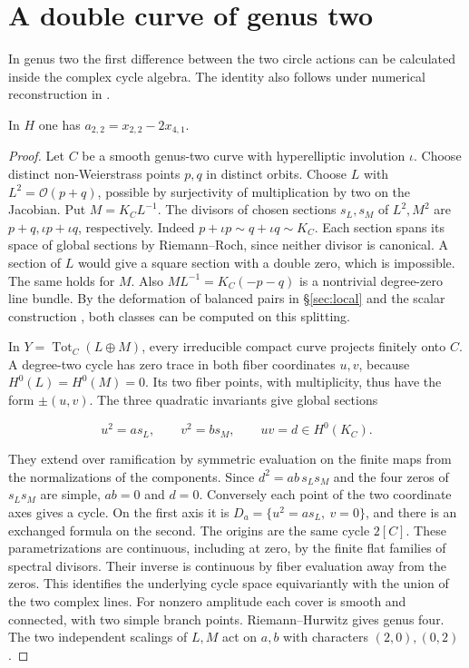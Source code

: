\section{A double curve of genus two}\label{sec:double}

In genus two the first difference between the two circle actions can
be calculated inside the complex cycle algebra. The identity also
follows under numerical reconstruction in \cite[\S6]{PaperIII}.

\begin{proposition}\label{prop:double}
In $H$ one has $a_{2,2}=x_{2,2}-2x_{4,1}$.
\end{proposition}
\begin{proof}
Let $C$ be a smooth genus-two curve with hyperelliptic involution
$\iota$. Choose distinct non-Weierstrass points $p,q$ in distinct
orbits. Choose $L$ with $L^2=\mathcal O(p+q)$, possible by
surjectivity of multiplication by two on the Jacobian. Put
$M=K_C L^{-1}$. The divisors of chosen sections $s_L,s_M$ of
$L^2,M^2$ are $p+q,\iota p+\iota q$, respectively. Indeed
$p+\iota p\sim q+\iota q\sim K_C$. Each section spans its space
of global sections by Riemann--Roch, since neither divisor is
canonical. A section of $L$ would give a square section with a
double zero, which is impossible. The same holds for $M$. Also
$ML^{-1}=K_C(-p-q)$ is a nontrivial degree-zero line bundle.
By the deformation of balanced pairs in \S\ref{sec:local} and the
scalar construction \cite[\S4.3]{Pardon}, both classes can be
computed on this splitting.

In $Y=\operatorname{Tot}_C(L\oplus M)$, every irreducible compact
curve projects finitely onto $C$. A degree-two cycle has zero trace
in both fiber coordinates $u,v$, because $H^0(L)=H^0(M)=0$.
Its two fiber points, with multiplicity, thus have the form
$\pm(u,v)$. The three quadratic invariants give global sections

\[
        u^2=a s_L,\qquad v^2=b s_M,\qquad uv=d\in H^0(K_C).
\]

They extend over ramification by symmetric evaluation on the finite
maps from the normalizations of the components. Since
$d^2=ab\,s_Ls_M$ and the four zeros of $s_Ls_M$ are simple,
$ab=0$ and $d=0$. Conversely each point of the two coordinate
axes gives a cycle. On the first axis it is
$D_a=\{u^2=a s_L,\ v=0\}$, and there is an exchanged formula
on the second. The origins are the same cycle $2[C]$. These
parametrizations are continuous, including at zero, by the finite
flat families of spectral divisors. Their inverse is continuous by
fiber evaluation away from the zeros. This identifies the underlying
cycle space equivariantly with the union of the two complex lines.
For nonzero amplitude each cover is smooth and connected, with
two simple branch points. Riemann--Hurwitz gives genus four. The
two independent scalings of $L,M$ act on $a,b$ with characters
$(2,0),(0,2)$.


\end{proof}
